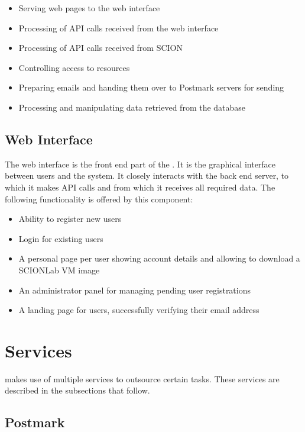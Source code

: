\begin{itemize}
	\item Serving web pages to the \lcs web interface
	\item Processing of API calls received from the \lcs web interface
	\item Processing of API calls received from SCION \lmi
	\item Controlling access to resources
	\item Preparing emails and handing them over to Postmark servers for sending
	\item Processing and manipulating data retrieved from the database
\end{itemize}

\subsection{Web Interface}

The web interface is the front end part of the \lcs. It is the graphical interface between users and the system. It closely interacts with the back end server, to which it makes API calls and from which it receives all required data. The following functionality is offered by this component:

 \begin{itemize}
 	\item Ability to register new users
 	\item Login for existing users
 	\item A personal page per user showing account details and allowing to download a SCIONLab VM image
 	\item An administrator panel for managing pending user registrations
 	\item A landing page for users, successfully verifying their email address

 \end{itemize}

\section{Services}

\lcs makes use of multiple services to outsource certain tasks. These services are described in the subsections that follow.

\subsection{Postmark}
\label{archi:postmark}

